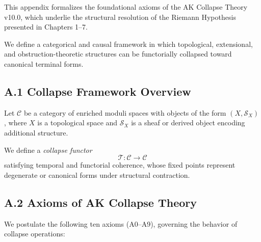\documentclass[11pt]{article}
\begin{document}
This appendix formalizes the foundational axioms of the AK Collapse Theory v10.0,  
which underlie the structural resolution of the Riemann Hypothesis presented in Chapters 1–7.

We define a categorical and causal framework in which topological, extensional, and obstruction-theoretic structures  
can be functorially collapsed toward canonical terminal forms.

\subsection*{A.1 Collapse Framework Overview}

Let $\mathcal{C}$ be a category of enriched moduli spaces with objects of the form $(X, \mathcal{S}_X)$,  
where $X$ is a topological space and $\mathcal{S}_X$ is a sheaf or derived object encoding additional structure.

We define a \emph{collapse functor}
\[
\mathcal{T} : \mathcal{C} \to \mathcal{C}
\]
satisfying temporal and functorial coherence, whose fixed points represent degenerate or canonical forms under structural contraction.

\subsection*{A.2 Axioms of AK Collapse Theory}

We postulate the following ten axioms (A0–A9), governing the behavior of collapse operations:
\end{document}
